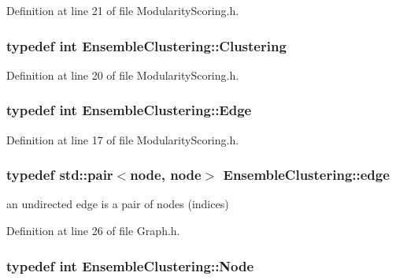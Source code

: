 Definition at line 21 of file Modularity\-Scoring.\-h.

\hypertarget{namespace_ensemble_clustering_a8376de7054d9b646ad127a6256989024}{
\subsubsection[{Clustering}]{\setlength{\rightskip}{0pt plus 5cm}typedef int {\bf Ensemble\-Clustering\-::\-Clustering}}}\label{namespace_ensemble_clustering_a8376de7054d9b646ad127a6256989024}


Definition at line 20 of file Modularity\-Scoring.\-h.

\hypertarget{namespace_ensemble_clustering_abb5f21f23a27c13de604d6ff457ac94b}{
\subsubsection[{Edge}]{\setlength{\rightskip}{0pt plus 5cm}typedef int {\bf Ensemble\-Clustering\-::\-Edge}}}\label{namespace_ensemble_clustering_abb5f21f23a27c13de604d6ff457ac94b}


Definition at line 17 of file Modularity\-Scoring.\-h.

\hypertarget{namespace_ensemble_clustering_aff19dd5e3051ee3d4360fd3f29daf16b}{
\subsubsection[{edge}]{\setlength{\rightskip}{0pt plus 5cm}typedef std\-::pair$<${\bf node}, {\bf node}$>$ {\bf Ensemble\-Clustering\-::edge}}}\label{namespace_ensemble_clustering_aff19dd5e3051ee3d4360fd3f29daf16b}


an undirected edge is a pair of nodes (indices) 



Definition at line 26 of file Graph.\-h.

\hypertarget{namespace_ensemble_clustering_a136bcdc52fb2f62a89bc8bf8c1a7cb8f}{
\subsubsection[{Node}]{\setlength{\rightskip}{0pt plus 5cm}typedef int {\bf Ensemble\-Clustering\-::\-Node}}}\label{namespace_ensemble_clustering_a136bcdc52fb2f62a89bc8bf8c1a7cb8f}


